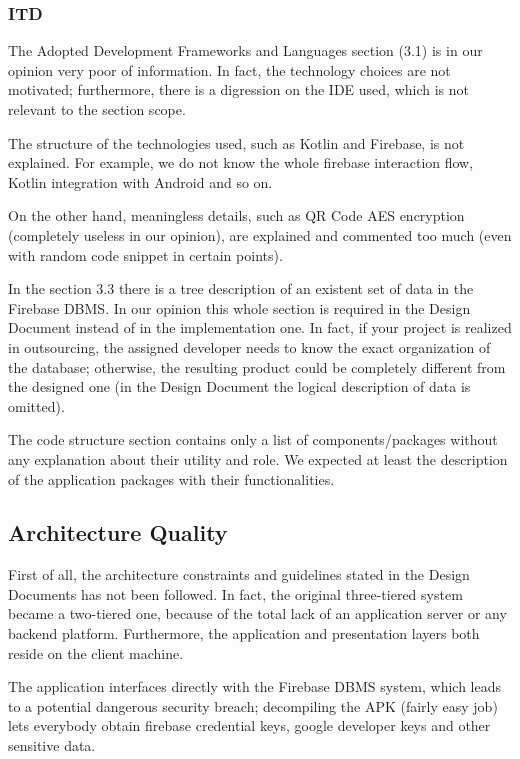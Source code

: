 \documentclass[table, 12pt]{article}
\begin{document}
\subsubsection{ITD}
The Adopted Development Frameworks and Languages section (3.1) is in our opinion very poor of information.
In fact, the technology choices are not motivated; furthermore, there is a digression on the IDE used, which is not relevant to the section scope.

The structure of the technologies used, such as Kotlin and Firebase, is not explained.
For example, we do not know the whole firebase interaction flow, Kotlin integration with Android and so on.

On the other hand, meaningless details, such as QR Code AES encryption (completely useless in our opinion), are explained and commented too much (even with random code snippet in certain points).

In the section 3.3 there is a tree description of an existent set of data in the Firebase DBMS. In our opinion this whole section is required in the Design Document instead of in the implementation one. In fact, if your project is realized in outsourcing, the assigned developer needs to know the exact organization of the database; otherwise, the resulting product could be completely different from the designed one (in the Design Document the logical description of data is omitted).

The code structure section contains only a list of components/packages without any explanation about their utility and role. We expected at least the description of the application packages with their functionalities.

\subsection{Architecture Quality}
First of all, the architecture constraints and guidelines stated in the Design Documents has not been followed.
In fact, the original three-tiered system became a two-tiered one, because of the total lack of an application server or any backend platform. Furthermore, the application and presentation layers both reside on the client machine.

The application interfaces directly with the Firebase DBMS system, which leads to a potential dangerous security breach; decompiling the APK (fairly easy job) lets everybody obtain firebase credential keys, google developer keys and other sensitive data.
\end{document}
